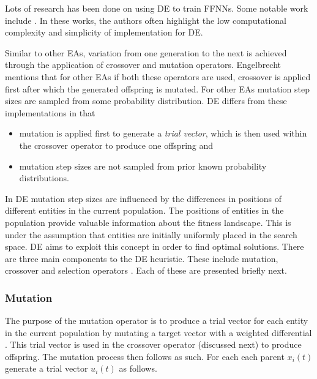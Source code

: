 Lots of research has been done on using \ac{DE} to train \acp{FFNN}. Some notable work include \cite{ref:ilonen:2003}\cite{ref:slowik:2008}\cite{ref:mingguang:2009}. In these works, the authors often highlight the low computational complexity and simplicity of implementation for \ac{DE}.

Similar to other \acp{EA}, variation from one generation to the next is achieved through the application of crossover and mutation operators. Engelbrecht \cite{ref:engelbrecht:2007} mentions that for other \acp{EA} if both these operators are used, crossover is applied first after which the generated offspring is mutated. For other \acp{EA} mutation step sizes are sampled from some probability distribution. \ac{DE} differs from these implementations in that

\begin{itemize}
    \item mutation is applied first to generate a \textit{trial vector}, which is then used within the crossover operator to produce one offspring and
    \item mutation step sizes are not sampled from prior known probability distributions.
\end{itemize}

In \ac{DE} mutation step sizes are influenced by the differences in positions of different entities in the current population. The positions of entities in the population provide valuable information about the fitness landscape. This is under the assumption that entities are initially uniformly placed in the search space. \ac{DE} aims to exploit this concept in order to find optimal solutions. There are three main components to the \ac{DE} heuristic. These include mutation, crossover and selection operators \cite{ref:price:2006}. Each of these are presented briefly next.

\subsubsection{Mutation}
\label{sec:heuristics:mh:de:mutation}

The purpose of the mutation operator is to produce a trial vector for each entity in the current population by mutating a target vector with a weighted differential \cite{ref:engelbrecht:2007}. This trial vector is used in the crossover operator (discussed next) to produce offspring. The mutation process then follows as such. For each each parent $x_{i}(t)$ generate a trial vector $u_{i}(t)$ as follows.

